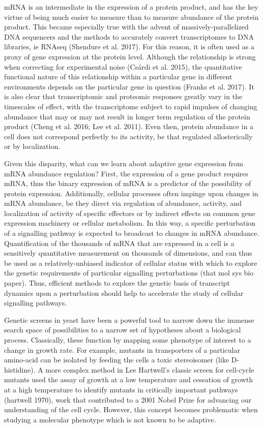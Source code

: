 mRNA is an intermediate in the expression of a protein product, and
has the key virtue of being much easier to measure than to measure
abundance of the protein product. This became especially true with the
advent of massively-parallelized DNA sequencers and the methods to
accurately convert transcriptomes to DNA libraries, ie RNAseq
(Shendure et al. 2017). For this reason, it is often used as a proxy
of gene expression at the protein level. Although the relationship is
strong when correcting for experimental noise (Csárdi et al. 2015),
the quantitative functional nature of this relationship within a
particular gene in different environments depends on the particular
gene in question (Franks et al. 2017). It is also clear that
transcriptomic and proteomic responses greatly vary in the timescales
of effect, with the transcriptome subject to rapid impulses of
changing abundance that may or may not result in longer term
regulation of the protein product (Cheng et al. 2016; Lee et al.
2011). Even then, protein abundance in a cell does not correspond
perfectly to its activity, be that regulated allosterically or by
localization.  

Given this disparity, what can we learn about adaptive
gene expression from mRNA abundance regulation? First, the expression
of a gene product requires mRNA, thus the binary expression of mRNA is
a predictor of the possibility of protein expression. Additionally,
cellular processes often impinge upon changes in mRNA abundance, be
they direct via regulation of abundance, activity, and localization of
activity of specific effectors or by indirect effects on common gene
expression machinery or cellular metabolism. In this way, a specific
perturbation of a signalling pathway is expected to broadcast to
changes in mRNA abundance. Quantification of the thousands of mRNA
that are expressed in a cell is a sensitively quantitative measurement
on thousands of dimensions, and can thus be used as a
relatively-unbiased indicator of cellular status with which to explore
the genetic requirements of particular signalling perturbations (that
mol sys bio paper). Thus, efficient methods to explore the genetic
basis of transcript dynamics upon a perturbation should help to
accelerate the study of cellular signalling pathways.  

Genetic screens
in yeast have been a powerful tool to narrow down the immense search
space of possibilities to a narrow set of hypotheses about a
biological process. Classically, these function by mapping some
phenotype of interest to a change in growth rate. For example, mutants
in transporters of a particular amino-acid can be isolated by feeding
the cells a toxic stereoisomer (like D-histidine). A more complex
method in Lee Hartwell’s classic screen for cell-cycle mutants used
the assay of growth at a low temperature and cessation of growth at a
high temperature to identify mutants in critically important pathways
(hartwell 1970), work that contributed to a 2001 Nobel Prize for
advancing our understanding of the cell cycle. However, this concept
becomes problematic when studying a molecular phenotype which is not
known to be adaptive. 

